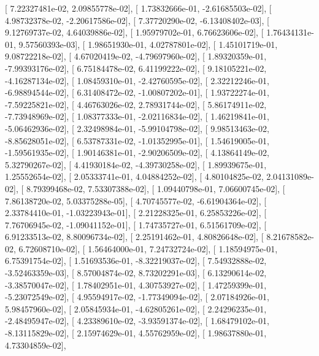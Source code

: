 \documentclass{article}
\begin{document}
       [  7.22327481e-02,   2.09855778e-02],
       [  1.73832666e-01,  -2.61685503e-02],
       [  4.98732378e-02,  -2.20617586e-02],
       [  7.37720290e-02,  -6.13408402e-03],
       [  9.12769737e-02,   4.64039886e-02],
       [  1.95979702e-01,   6.76623606e-02],
       [  1.76434131e-01,   9.57560393e-03],
       [  1.98651930e-01,   4.02787801e-02],
       [  1.45101719e-01,   9.08722218e-02],
       [  4.67020419e-02,  -4.79697960e-02],
       [  1.89320359e-01,  -7.99393176e-02],
       [  6.75184478e-02,   6.41199222e-02],
       [  9.18105221e-02,  -4.16287134e-02],
       [  1.08459310e-01,  -2.42760595e-02],
       [  2.32212246e-01,  -6.98894544e-02],
       [  6.31408472e-02,  -1.00807202e-01],
       [  1.93722274e-01,  -7.59225821e-02],
       [  4.46763026e-02,   2.78931744e-02],
       [  5.86174911e-02,  -7.73948969e-02],
       [  1.08377333e-01,  -2.02116834e-02],
       [  1.46219841e-01,  -5.06462936e-02],
       [  2.32498984e-01,  -5.99104798e-02],
       [  9.98513463e-02,  -8.85628051e-02],
       [  6.53787331e-02,  -1.01352995e-01],
       [  1.54619005e-01,  -1.59561935e-02],
       [  1.90146381e-01,  -2.90206509e-02],
       [  4.13864149e-02,   5.32790267e-02],
       [  4.41930184e-02,  -4.39730258e-02],
       [  1.89939675e-01,   1.25552654e-02],
       [  2.05333741e-01,   4.04884252e-02],
       [  4.80104825e-02,   2.04131089e-02],
       [  8.79399468e-02,   7.53307388e-02],
       [  1.09440798e-01,   7.06600745e-02],
       [  7.86138720e-02,   5.03375288e-05],
       [  4.70745577e-02,  -6.61904364e-02],
       [  2.33784410e-01,  -1.03223943e-01],
       [  2.21228325e-01,   6.25853226e-02],
       [  7.76706945e-02,  -1.09041152e-01],
       [  1.74735727e-01,   6.51561709e-02],
       [  6.91233513e-02,   8.80096734e-02],
       [  2.25191462e-01,   4.80826648e-02],
       [  8.21678582e-02,   6.72608710e-02],
       [  1.56464000e-01,   7.24732724e-02],
       [  1.18594975e-01,   6.75391754e-02],
       [  1.51693536e-01,  -8.32219037e-02],
       [  7.54932888e-02,  -3.52463359e-03],
       [  8.57004874e-02,   8.73202291e-03],
       [  6.13290614e-02,  -3.38570047e-02],
       [  1.78402951e-01,   4.30753927e-02],
       [  1.47259399e-01,  -5.23072549e-02],
       [  4.95594917e-02,  -1.77349094e-02],
       [  2.07184926e-01,   5.98457960e-02],
       [  2.05845934e-01,  -4.62805261e-02],
       [  2.24296235e-01,  -2.48495947e-02],
       [  4.23389610e-02,  -3.93591374e-02],
       [  1.68479102e-01,  -8.13115829e-02],
       [  2.15974629e-01,   4.55762959e-02],
       [  1.98637880e-01,   4.73304859e-02],
\end{document}
